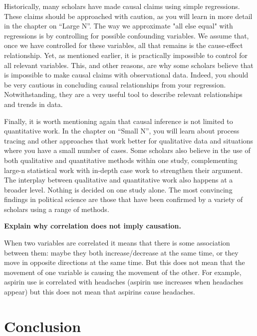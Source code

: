 \documentclass{book}
\newenvironment{shaded*}{
    \begin{center}
    \begin{tabular}{|p{0.9\textwidth}|}
    \hline\\
    }
    { 
    \\\\\hline
    \end{tabular} 
    \end{center}
}
\begin{document}
Historically, many scholars have made causal claims using simple regressions.
These claims should be approached with caution, as you will learn in more
detail in the chapter on ``Large N''. The way we approximate "all else equal"
with regressions is by controlling for possible confounding variables. We
assume that, once we have controlled for these variables, all that remains is
the cause-effect relationship. Yet, as mentioned earlier, it is practically
impossible to control for all relevant variables. This, and other reasons, are
why some scholars believe that is impossible to make causal claims with
observational data. Indeed, you should be very cautious in concluding causal
relationships from your regression. Notwithstanding, they are a very useful
tool to describe relevant relationships and trends in data.

Finally, it is worth mentioning again that causal inference is not limited to
quantitative work. In the chapter on ``Small N'', you will learn about process
tracing and other approaches that work better for qualitative data and
situations where you have a small number of cases. Some scholars also believe
in the use of both qualitative and quantitative methods within one study,
complementing large-n statistical work with in-depth case work to strengthen
their argument. The interplay between qualitative and quantitative work also
happens at a broader level. Nothing is decided on one study alone. The most
convincing findings in political science are those that have been confirmed by
a variety of scholars using a range of methods.

\textbf{Explain why correlation does not imply causation.}

\begin{shaded*}

When two variables are correlated it means that there is some association
between them: maybe they both increase/decrease at the same time, or they move
in opposite directions at the same time. But this does not mean that the
movement of one variable is causing the movement of the other. For example,
aspirin use is correlated with headaches (aspirin use increases when headaches
appear) but this does not mean that aspirins cause headaches.

\end{shaded*}

\hypertarget{conclusion}{%
\section{Conclusion}\label{conclusion}}
\end{document}
